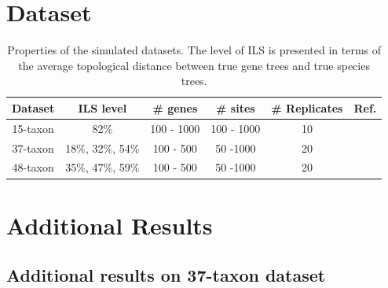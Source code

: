 \documentclass[10pt,a4paper]{article}
\begin{document}


\clearpage
\section{Dataset}
\label{app:dataset}

\begin{table}[htbp]
\caption{Properties of the simulated datasets. The level of ILS is presented in terms of the average topological distance between true gene trees and true species trees.}
\label{table.data-description}
\centering
\begin{tabular}{c c c c c c} 
 \hline
 Dataset & ILS level & \# genes & \# sites & \# Replicates & Ref.\\  [0.5ex]
 \hline\hline
 15-taxon & 82\% & 100 - 1000 & 100 - 1000 & 10 & \cite{bayzid2015weighted}\\
 \hline
 37-taxon & 18\%, 32\%, 54\% & 100 - 500 & 50 -1000 & 20 & \cite{statistical-binning}\\
 \hline
 48-taxon & 35\%, 47\%, 59\% & 100 - 500 & 50 -1000 & 20 & \cite{statistical-binning}\\
 \hline
 
\end{tabular}
\end{table}

\section{Additional Results}
\label{app:additional-results}

\subsection{Additional results on 37-taxon dataset}
\label{app:37-taxon}
\end{document}
